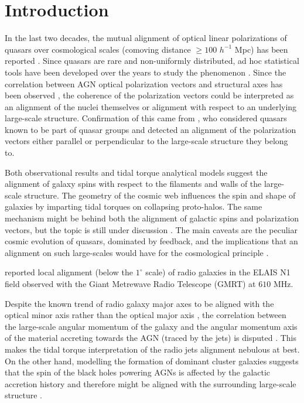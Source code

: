 \section{Introduction}

	In the last two decades, the mutual alignment of optical linear polarizations of quasars over cosmological scales (comoving distance $\geq 100$ $h^{-1}$ Mpc) has been reported \citep{Hutsemekers1998, Lamy2001, Cabanac2005}. Since quasars are rare and non-uniformly distributed, ad hoc statistical tools have been developed over the years to study the phenomenon \citep{Jain2004, Shurtleff2013, Pelgrims2014}. Since the correlation between AGN optical polarization vectors and structural axes has been observed \citep[e.g.,][]{Lyutikov2005, Battye2009}, the coherence of the polarization vectors could be interpreted as an alignment of the nuclei themselves or alignment with respect to an underlying large-scale structure. Confirmation of this came from \cite{Hutsemekers2014}, who considered quasars known to be part of quasar groups and detected an alignment of the polarization vectors either parallel or perpendicular to the large-scale structure they belong to.
		
	Both observational results \citep[e.g.,][]{Tempel2013, Zhang2013, Hirv2016} and tidal torque analytical models \citep[e.g.,][]{Codis2015, Lee2004} suggest the alignment of galaxy spins with respect to the filaments and walls of the large-scale structure. The geometry of the cosmic web influences the spin and shape of galaxies by imparting tidal torques on collapsing proto-halos. The same mechanism might be behind both the alignment of galactic spins and polarization vectors, but the topic is still under discussion \citep{Hutsemekers2014}. The main caveats are the peculiar cosmic evolution of quasars, dominated by feedback, and the implications that an alignment on such large-scales would have for the cosmological principle \citep[see, for example,][]{Zhao2016}.
		
	\cite{Taylor2016} reported local alignment (below the $1^\circ$ scale) of radio galaxies in the ELAIS N1 field observed with the Giant Metrewave Radio Telescope (GMRT) at $610$ MHz. 
	
	Despite the known trend of radio galaxy major axes to be aligned with the optical minor axis rather than the optical
	major axis \citep[e.g.,][]{Andernach1995, Battye2009, Kaviraj2015}, the correlation between the large-scale angular momentum of the galaxy and the angular momentum axis of the material accreting towards the AGN (traced by the jets) is disputed \citep{Hopkins2012}. This makes the tidal torque interpretation of the radio jets alignment nebulous at best. On the other hand, modelling the formation of dominant cluster galaxies suggests that the spin of the black holes powering AGNs is affected by the galactic accretion history and therefore might be aligned with the surrounding large-scale structure \citep{West1994}.
	
